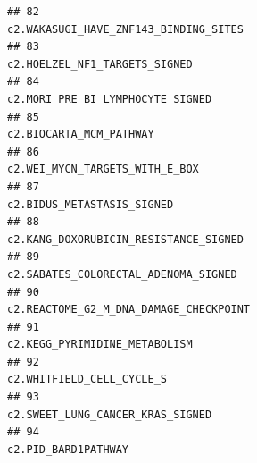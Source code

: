 \documentclass{article}\usepackage[]{graphicx}\usepackage[]{color}
\makeatletter
\newenvironment{kframe}{%
 \def\at@end@of@kframe{}%
 \ifinner\ifhmode%
  \def\at@end@of@kframe{\end{minipage}}%
  \begin{minipage}{\columnwidth}%
 \fi\fi%
 \def\FrameCommand##1{\hskip\@totalleftmargin \hskip-\fboxsep
 \colorbox{shadecolor}{##1}\hskip-\fboxsep
     \hskip-\linewidth \hskip-\@totalleftmargin \hskip\columnwidth}%
 \MakeFramed {\advance\hsize-\width
   \@totalleftmargin\z@ \linewidth\hsize
   \@setminipage}}%
 {\par\unskip\endMakeFramed%
 \at@end@of@kframe}
\newenvironment{knitrout}{}{} %
\makeatother
\begin{document}
\begin{knitrout}
\begin{kframe}
\begin{verbatim}
## 82                                                                                                                                                                             c2.WAKASUGI_HAVE_ZNF143_BINDING_SITES
## 83                                                                                                                                                                                     c2.HOELZEL_NF1_TARGETS_SIGNED
## 84                                                                                                                                                                                  c2.MORI_PRE_BI_LYMPHOCYTE_SIGNED
## 85                                                                                                                                                                                           c2.BIOCARTA_MCM_PATHWAY
## 86                                                                                                                                                                                    c2.WEI_MYCN_TARGETS_WITH_E_BOX
## 87                                                                                                                                                                                        c2.BIDUS_METASTASIS_SIGNED
## 88                                                                                                                                                                             c2.KANG_DOXORUBICIN_RESISTANCE_SIGNED
## 89                                                                                                                                                                              c2.SABATES_COLORECTAL_ADENOMA_SIGNED
## 90                                                                                                                                                                            c2.REACTOME_G2_M_DNA_DAMAGE_CHECKPOINT
## 91                                                                                                                                                                                     c2.KEGG_PYRIMIDINE_METABOLISM
## 92                                                                                                                                                                                         c2.WHITFIELD_CELL_CYCLE_S
## 93                                                                                                                                                                                  c2.SWEET_LUNG_CANCER_KRAS_SIGNED
## 94                                                                                                                                                                                               c2.PID_BARD1PATHWAY

\end{verbatim}
\end{kframe}
\end{knitrout}
\end{document}
